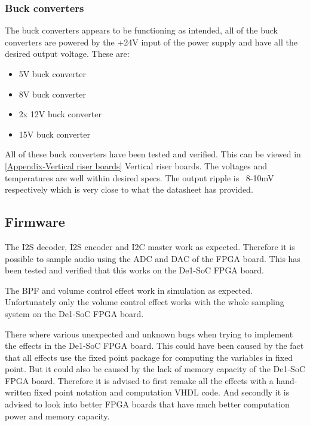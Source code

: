 \subsubsection{Buck converters}
The buck converters appears to be functioning as intended, all of the buck converters are powered by the +24V input of the power supply and have all the desired output voltage. These are:
\begin{itemize}
\item 5V buck converter
\item 8V buck converter
\item 2x 12V buck converter
\item 15V buck converter
\end{itemize}  
All of these buck converters have been tested and verified. This can be viewed in \ref{Appendix-Vertical riser boards} Vertical riser boards. The voltages and temperatures are well within desired specs. The output ripple is ~8-10mV respectively which is very close to what the datasheet has provided. 


\subsection{Firmware}
The I2S decoder, I2S encoder and I2C master work as expected. Therefore it is possible to sample audio using the ADC and DAC of the FPGA board. This has been tested and verified that this works on the De1-SoC FPGA board. 

The BPF and volume control effect work in simulation as expected. Unfortunately only the volume control effect works with the whole sampling system on the De1-SoC FPGA board. 

There where various unexpected and unknown bugs when trying to implement the effects in the De1-SoC FPGA board. This could have been caused by the fact that all effects use the fixed point package for computing the variables in fixed point. But it could also be caused by the lack of memory capacity of the De1-SoC FPGA board. Therefore it is advised to first remake all the effects with a hand-written fixed point notation and computation VHDL code. And secondly it is advised to look into better FPGA boards that have much better computation power and memory capacity.